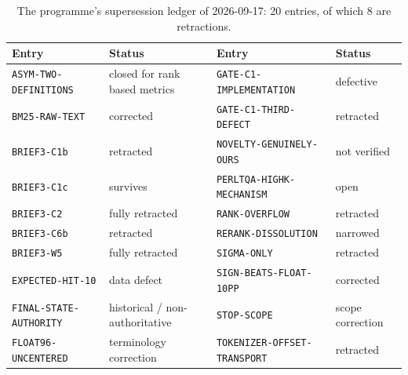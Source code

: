 \begin{table}[H]
\centering
\footnotesize
\caption{The programme's supersession ledger of 2026-09-17: 20 entries, of which 8 are retractions.}
\label{tab:supersession}
\begin{tabularx}{\linewidth}{@{}l >{\raggedright\arraybackslash}X l >{\raggedright\arraybackslash}X@{}}
\toprule
Entry & Status & Entry & Status \\
\midrule
\texttt{ASYM-TWO-DEFINITIONS} & closed for rank based metrics & \texttt{GATE-C1-IMPLEMENTATION} & defective \\
\texttt{BM25-RAW-TEXT} & corrected & \texttt{GATE-C1-THIRD-DEFECT} & retracted \\
\texttt{BRIEF3-C1b} & retracted & \texttt{NOVELTY-GENUINELY-OURS} & not verified \\
\texttt{BRIEF3-C1c} & survives & \texttt{PERLTQA-HIGHK-MECHANISM} & open \\
\texttt{BRIEF3-C2} & fully retracted & \texttt{RANK-OVERFLOW} & retracted \\
\texttt{BRIEF3-C6b} & retracted & \texttt{RERANK-DISSOLUTION} & narrowed \\
\texttt{BRIEF3-W5} & fully retracted & \texttt{SIGMA-ONLY} & retracted \\
\texttt{EXPECTED-HIT-10} & data defect & \texttt{SIGN-BEATS-FLOAT-10PP} & corrected \\
\texttt{FINAL-STATE-AUTHORITY} & historical / non-authoritative & \texttt{STOP-SCOPE} & scope correction \\
\texttt{FLOAT96-UNCENTERED} & terminology correction & \texttt{TOKENIZER-OFFSET-TRANSPORT} & retracted \\
\bottomrule
\end{tabularx}
\end{table}
